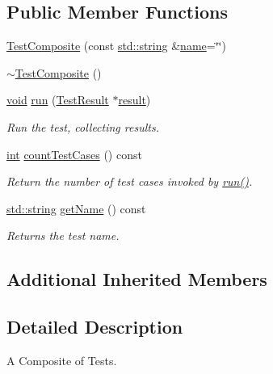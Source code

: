 \subsection*{Public Member Functions}
\begin{DoxyCompactItemize}
\item 
\hyperlink{class_test_composite_aa82b05d6ca806b023beba504ec9b1d41}{Test\-Composite} (const \hyperlink{glew_8h_ae84541b4f3d8e1ea24ec0f466a8c568b}{std\-::string} \&\hyperlink{fmod__codec_8h_a5c4947d4516dd7cfa3505ce3a648a4ef}{name}=\char`\"{}\char`\"{})
\item 
\hyperlink{class_test_composite_aefd313285d90fc6c90a301b0a0ffddf3}{$\sim$\-Test\-Composite} ()
\item 
\hyperlink{wglew_8h_aeea6e3dfae3acf232096f57d2d57f084}{void} \hyperlink{class_test_composite_a2ba14045b1a1e83963dd4db746b04dfd}{run} (\hyperlink{class_test_result}{Test\-Result} $\ast$\hyperlink{glew_8h_a5fb5836a37f7607602a16ad733ed6357}{result})
\begin{DoxyCompactList}\small\item\em Run the test, collecting results. \end{DoxyCompactList}\item 
\hyperlink{wglew_8h_a500a82aecba06f4550f6849b8099ca21}{int} \hyperlink{class_test_composite_aab3a79f9629eb6f026467e9c27b08788}{count\-Test\-Cases} () const 
\begin{DoxyCompactList}\small\item\em Return the number of test cases invoked by \hyperlink{class_test_composite_a2ba14045b1a1e83963dd4db746b04dfd}{run()}. \end{DoxyCompactList}\item 
\hyperlink{glew_8h_ae84541b4f3d8e1ea24ec0f466a8c568b}{std\-::string} \hyperlink{class_test_composite_addf2aec7ab7233e433cb5bdf98defb61}{get\-Name} () const 
\begin{DoxyCompactList}\small\item\em Returns the test name. \end{DoxyCompactList}\end{DoxyCompactItemize}
\subsection*{Additional Inherited Members}


\subsection{Detailed Description}
A Composite of Tests. 


